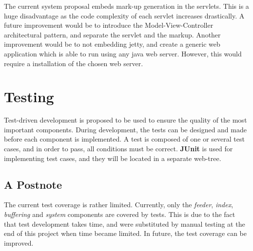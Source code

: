 The current system proposal embeds mark-up generation in the servlets. This is a huge disadvantage as the code complexity of each servlet increases drastically. A future improvement would be to introduce the Model-View-Controller architectural pattern, and separate the servlet and the markup. Another improvement would be to not embedding jetty, and create a generic web application which is able to run using any java web server. However, this would require a installation of the chosen web server.

\section{Testing}
Test-driven development is proposed to be used to ensure the quality of the most important components. During development, the tests can be designed and made before each component is implemented. A test is composed of one or several test cases, and in order to pass, all conditions must be correct. {\bf JUnit} is used for implementing test cases, and they will be located in a separate web-tree.

\subsection{A Postnote}
The current test coverage is rather limited. Currently, only the {\it feeder}, {\it index}, {\it buffering} and {\it system} components are covered by tests. This is due to the fact that test development takes time, and were substituted by manual testing at the end of this project when time became limited. In future, the test coverage can be improved.